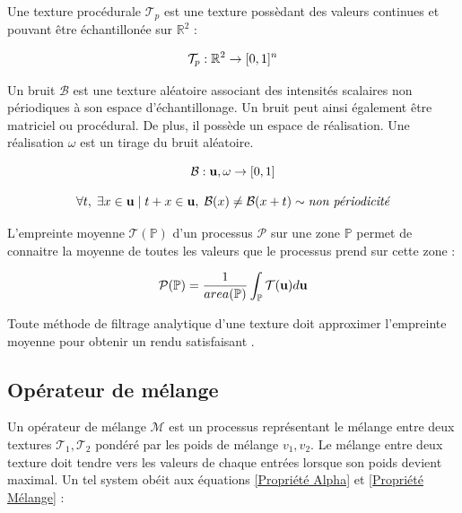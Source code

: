 \documentclass{article}
\begin{document}
Une texture procédurale $\mathcal{T}_p$ est une texture possèdant des valeurs
continues et pouvant être échantillonée sur $\mathbb{R}^2$ :

\begin{equation}\centering\label{Def Texture Procédurale}
    \mathcal{T}_p : \mathbb{R}^2 \rightarrow [0, 1]^n
\end{equation}

Un bruit $\mathcal{B}$ est une texture aléatoire associant des intensités
scalaires non périodiques \cite{SOA_Noise} à son espace d'échantillonage. Un
bruit peut ainsi également être matriciel ou procédural. De plus, il possède un
espace de réalisation. Une réalisation $\omega$ est un tirage du bruit
aléatoire.

\begin{equation}\centering\label{Def Bruit}
    \mathcal{B} : \mathbf{u}, \omega \rightarrow [0, 1]
\end{equation}

\begin{equation}\centering\label{Def Bruit Non périodique}
    \forall t, \; \exists x \in \mathbf{u} \mid t+x \in \mathbf{u} , \; \mathcal{B}(x) \neq \mathcal{B}(x + t) \sim \textit{non périodicité}
\end{equation}

L'empreinte moyenne $\mathcal{T}(\mathbb{P})$ d'un processus $\mathcal{P}$ sur
une zone $\mathbb{P}$ permet de connaitre la moyenne de toutes les valeurs que
le processus prend sur cette zone :

\begin{equation}\centering\label{Def Empreinte}
    \mathcal{P}(\mathbb{P}) = \frac{1}{area(\mathbb{P})} \int_{\mathbb{P}} \mathcal{T}(\mathbf{u}) d \mathbf{u}
\end{equation}

Toute méthode de filtrage analytique d'une texture doit approximer l'empreinte
moyenne pour obtenir un rendu satisfaisant \cite{SOA_Noise}.

\subsection{Opérateur de mélange}

Un opérateur de mélange $\mathcal{M}$ est un processus représentant le mélange
entre deux textures $\mathcal{T}_1, \mathcal{T}_2$ pondéré par les poids de
mélange $v_1, v_2$. Le mélange entre deux texture doit tendre vers les valeurs
de chaque entrées lorsque son poids devient maximal. Un tel system obéit aux
équations \ref{Propriété Alpha} et \ref{Propriété Mélange} :
\end{document}
